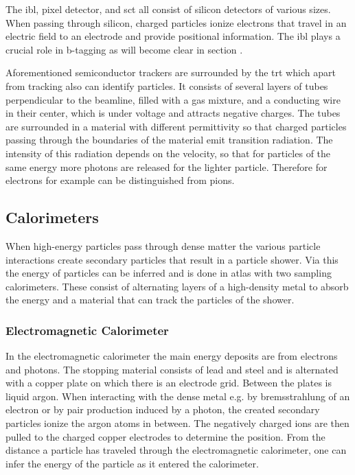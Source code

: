 The \ac{ibl}, pixel detector, and \ac{sct} all consist of silicon detectors of various sizes. When passing through silicon, charged particles ionize electrons that travel in an electric field to an electrode and provide positional information. The \ac{ibl} plays a crucial role in b-tagging as will become clear in section .

Aforementioned semiconductor trackers are surrounded by the \ac{trt} which apart from tracking also can identify particles. It consists of several layers of tubes perpendicular to the beamline, filled with a gas mixture, and a conducting wire in their center, which is under voltage and attracts negative charges. The tubes are surrounded in a material with different permittivity so that charged particles passing through the boundaries of the material emit transition radiation. The intensity of this radiation depends on the velocity, so that for particles of the same energy more photons are released for the lighter particle. Therefore for electrons for example can be distinguished from pions.

\subsection{Calorimeters}

When high-energy particles pass through dense matter the various particle interactions create secondary particles that result in a particle shower. Via this the energy of particles can be inferred and is done in \ac{atlas} with two sampling calorimeters. These consist of alternating layers of a high-density metal to absorb the energy and a material that can track the particles of the shower. 

\subsubsection*{Electromagnetic Calorimeter}
 
In the electromagnetic calorimeter the main energy deposits are from electrons and photons. The stopping material consists of lead and steel and is alternated with a copper plate on which there is an electrode grid. Between the plates is liquid argon. When interacting with the dense metal e.g. by bremsstrahlung of an electron or by pair production induced by a photon, the created secondary particles ionize the argon atoms in between. The negatively charged ions are then pulled to the charged copper electrodes to determine the position. From the distance a particle has traveled through the electromagnetic calorimeter, one can infer the energy of the particle as it entered the calorimeter.

